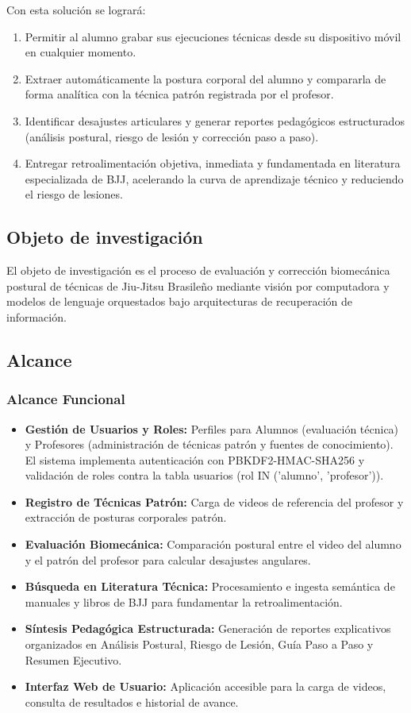Con esta solución se logrará:
\begin{enumerate}
    \item Permitir al alumno grabar sus ejecuciones técnicas desde su dispositivo móvil en cualquier momento.
    \item Extraer automáticamente la postura corporal del alumno y compararla de forma analítica con la técnica patrón registrada por el profesor.
    \item Identificar desajustes articulares y generar reportes pedagógicos estructurados (análisis postural, riesgo de lesión y corrección paso a paso).
    \item Entregar retroalimentación objetiva, inmediata y fundamentada en literatura especializada de BJJ, acelerando la curva de aprendizaje técnico y reduciendo el riesgo de lesiones.
\end{enumerate}

\subsection{Objeto de investigación}
El objeto de investigación es el proceso de evaluación y corrección biomecánica postural de técnicas de Jiu-Jitsu Brasileño mediante visión por computadora y modelos de lenguaje orquestados bajo arquitecturas de recuperación de información.

\subsection{Alcance}

\subsubsection{Alcance Funcional}
\begin{itemize}
    \item \textbf{Gestión de Usuarios y Roles:} Perfiles para Alumnos (evaluación técnica) y Profesores (administración de técnicas patrón y fuentes de conocimiento). El sistema implementa autenticación con PBKDF2-HMAC-SHA256 y validación de roles contra la tabla usuarios (rol IN ('alumno', 'profesor')).
    \item \textbf{Registro de Técnicas Patrón:} Carga de videos de referencia del profesor y extracción de posturas corporales patrón.
    \item \textbf{Evaluación Biomecánica:} Comparación postural entre el video del alumno y el patrón del profesor para calcular desajustes angulares.
    \item \textbf{Búsqueda en Literatura Técnica:} Procesamiento e ingesta semántica de manuales y libros de BJJ para fundamentar la retroalimentación.
    \item \textbf{Síntesis Pedagógica Estructurada:} Generación de reportes explicativos organizados en Análisis Postural, Riesgo de Lesión, Guía Paso a Paso y Resumen Ejecutivo.
    \item \textbf{Interfaz Web de Usuario:} Aplicación accesible para la carga de videos, consulta de resultados e historial de avance.
\end{itemize}

